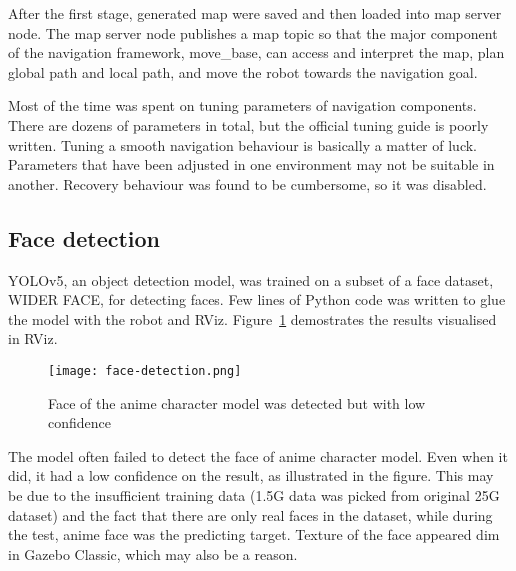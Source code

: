 After the first stage, generated map were saved and then loaded into map server node. The map server node publishes a map topic so that the major component of the navigation framework, move\_base, can access and interpret the map, plan global path and local path, and move the robot towards the navigation goal.

Most of the time was spent on tuning parameters of navigation components. There are dozens of parameters in total, but the official tuning guide is poorly written. Tuning a smooth navigation behaviour is basically a matter of luck. Parameters that have been adjusted in one environment may not be suitable in another. Recovery behaviour was found to be cumbersome, so it was disabled.


\subsection{Face detection}

YOLOv5, an object detection model, was trained on a subset of a face dataset, WIDER FACE, for detecting faces. Few lines of Python code was written to glue the model with the robot and RViz. Figure~\ref{fig:face-detection} demostrates the results visualised in RViz.

\begin{figure}[htbp]
   \centering
   \texttt{[image: face-detection.png]}
   \caption{Face of the anime character model was detected but with low confidence}
   \label{fig:face-detection}
\end{figure}

The model often failed to detect the face of anime character model. Even when it did, it had a low confidence on the result, as illustrated in the figure. This may be due to the insufficient training data (1.5G data was picked from original 25G dataset) and the fact that there are only real faces in the dataset, while during the test, anime face was the predicting target. Texture of the face appeared dim in Gazebo Classic, which may also be a reason.
